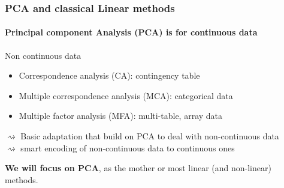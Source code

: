 \documentclass{beamer}\usepackage[]{graphicx}\usepackage[]{color}
\begin{document}
\begin{frame}
  \frametitle{PCA and classical Linear methods}
  
  \paragraph{\bf Principal component Analysis (PCA) is for continuous data}

  \begin{block}{Non continuous data}
  \begin{itemize}
    \item Correspondence analysis (CA): contingency table \medskip
    \item Multiple correspondence analysis (MCA): categorical data \medskip
    \item Multiple factor analysis (MFA): multi-table, array data 
  \end{itemize}
  $\rightsquigarrow$ Basic \alert{adaptation that build on PCA} to deal with non-continuous data\\
  $\rightsquigarrow$ smart encoding of non-continuous data to continuous ones
  \end{block}

  \vfill
  
  \begin{center}
    \alert{\bf We will focus on PCA}, as the mother or most linear (and non-linear) methods.
  \end{center}
  
\end{frame}
\end{document}
